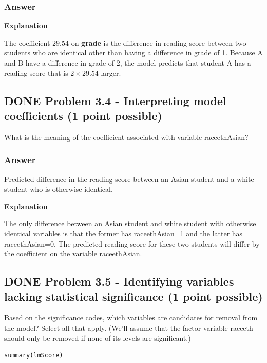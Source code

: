 \documentclass[letterpaper, 9pt, onecolumn, twoside, technote, final]{IEEEtran}
\begin{document}
\subsubsection{Answer}
\label{sec-2-10-1}

\textbf{Explanation}

The coefficient $29.54$ on \textbf{grade} is the difference in reading score
between two students who are identical other than having a difference
in grade of 1. Because A and B have a difference in grade of 2, the
model predicts that student A has a reading score that is $2 \times 29.54$
larger.

\subsection{{\bfseries\sffamily DONE} Problem 3.4 - Interpreting model coefficients (1 point possible)}
\label{sec-2-11}
What is the meaning of the coefficient associated with variable
raceethAsian?

\subsubsection{Answer}
\label{sec-2-11-1}

Predicted difference in the reading score between an Asian student and
a white student who is otherwise identical.

\textbf{Explanation}

The only difference between an Asian student and white student with
otherwise identical variables is that the former has raceethAsian=1
and the latter has raceethAsian=0. The predicted reading score for
these two students will differ by the coefficient on the variable
raceethAsian.

\subsection{{\bfseries\sffamily DONE} Problem 3.5 - Identifying variables lacking statistical significance (1 point possible)}
\label{sec-2-12}
Based on the significance codes, which variables are candidates for
removal from the model? Select all that apply. (We'll assume that the
factor variable raceeth should only be removed if none of its levels
are significant.)

\begin{verbatim}
summary(lmScore)
\end{verbatim}
\end{document}
